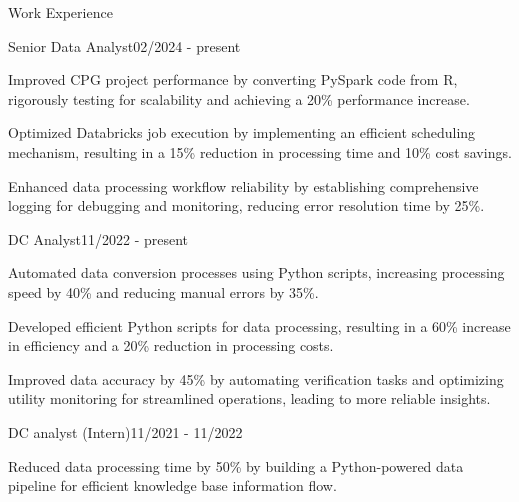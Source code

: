 \documentclass{resume} %
\begin{document}
    \begin{rSection}{Work Experience}
                    \begin{rSubsection}
                {Senior Data Analyst}{02/2024 - present}
                                    {}
                                {}
                                    \item Improved CPG project performance by converting PySpark code from R, rigorously testing for scalability and achieving a 20\% performance increase.
                                    \item Optimized Databricks job execution by implementing an efficient scheduling mechanism, resulting in a 15\% reduction in processing time and 10\% cost savings.
                                    \item Enhanced data processing workflow reliability by establishing comprehensive logging for debugging and monitoring, reducing error resolution time by 25\%.
                            \end{rSubsection}
                    \begin{rSubsection}
                {DC Analyst}{11/2022 - present}
                                    {}
                                {}
                                    \item Automated data conversion processes using Python scripts, increasing processing speed by 40\% and reducing manual errors by 35\%.
                                    \item Developed efficient Python scripts for data processing, resulting in a 60\% increase in efficiency and a 20\% reduction in processing costs.
                                    \item Improved data accuracy by 45\% by automating verification tasks and optimizing utility monitoring for streamlined operations, leading to more reliable insights.
                            \end{rSubsection}
                    \begin{rSubsection}
                {DC analyst (Intern)}{11/2021 - 11/2022}
                                    {}
                                {}
                                    \item Reduced data processing time by 50\% by building a Python{-}powered data pipeline for efficient knowledge base information flow.

\end{rSubsection}
\end{rSection}
\end{document}
